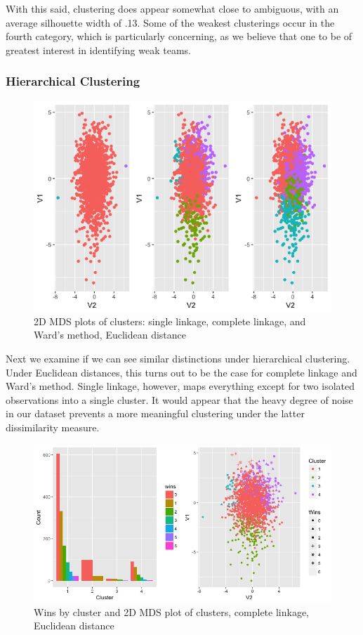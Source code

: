 \documentclass[10pt,a4paper, hidelinks]{article} %
\begin{document}
With this said, clustering does appear somewhat close to ambiguous, with an average silhouette width of .13.  Some of the weakest clusterings occur in the fourth category, which is particularly concerning, as we believe that one to be of greatest interest in identifying weak teams.

\subsubsection{Hierarchical Clustering}

\begin{figure}[H]
	\centering
	\includegraphics[width=0.7\linewidth]{../fig/areyouheigh}
		\caption{2D MDS plots of clusters: single linkage, complete linkage, and Ward's method, Euclidean distance}
\end{figure}

Next we examine if we can see similar distinctions under hierarchical clustering.  Under Euclidean distances, this turns out to be the case for complete linkage and Ward's method.  Single linkage, however, maps everything except for two isolated observations into a single cluster.  It would appear that the heavy degree of noise in our dataset prevents a more meaningful clustering under the latter dissimilarity measure.

\begin{figure}[H]
	\centering
	\includegraphics[width=0.7\linewidth]{../fig/comp1}
		\caption{Wins by cluster and 2D MDS plot of clusters, complete linkage, Euclidean distance}
\end{figure}
\end{document}
